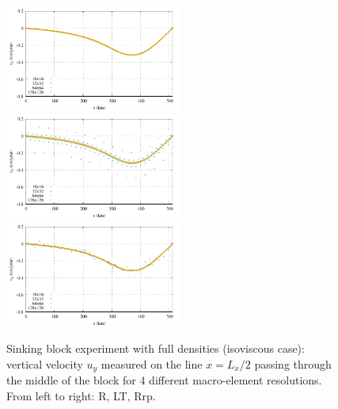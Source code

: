 \documentclass[a4paper,12pt]{article}
\begin{document}
\begin{figure}[t]
\centering
\includegraphics[width=5.8cm]{../results/exp08/vel_profile_topo0_full.pdf}
\includegraphics[width=5.8cm]{../results/exp08/vel_profile_topo2_full.pdf}
\includegraphics[width=5.8cm]{../results/exp08/vel_profile_topo9_full.pdf}
\caption{Sinking block experiment with full densities (isoviscous case): 
vertical velocity $u_y$ measured on the line $x=L_x/2$ passing through the middle of the block
for 4 different macro-element resolutions.
From left to right: R, LT, Rrp.
 \label{fig:block2}}
\end{figure}
\end{document}

